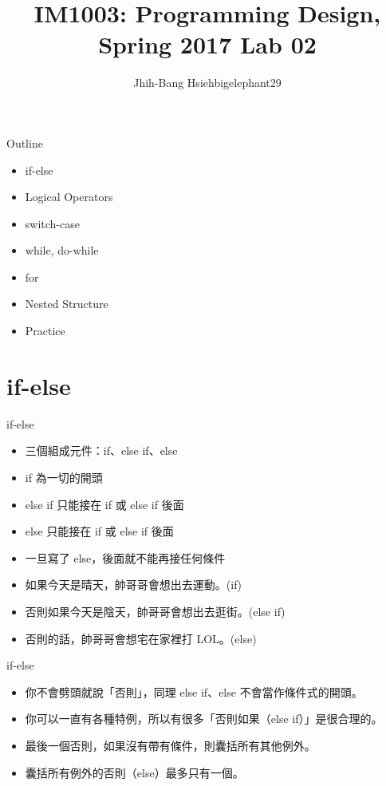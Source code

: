 \documentclass[t]{beamer}
\title{IM1003: Programming Design, Spring 2017  \linebreak Lab 02}
\author[bigelephant29]{Jhih-Bang Hsieh\linebreak \small{bigelephant29}}
\institute{\textbf{National Taiwan University}}
\date{}
\begin{document}
\begin{frame}
  \maketitle
\end{frame}

\begin{frame}{Outline}
  \begin{itemize}
    \item if-else
    \item Logical Operators
    \item switch-case
    \item while, do-while
    \item for
    \item Nested Structure
    \item Practice
  \end{itemize}
\end{frame}

\section{if-else}
\begin{frame}{if-else}
  \begin{itemize}
    \item 三個組成元件：if、else if、else
    \item if 為一切的開頭
    \item else if 只能接在 if 或 else if 後面
    \item else 只能接在 if 或 else if 後面
    \item 一旦寫了 else，後面就不能再接任何條件
  \end{itemize}
  \begin{itemize}
    \item 如果今天是晴天，帥哥哥會想出去運動。(if)
    \item 否則如果今天是陰天，帥哥哥會想出去逛街。(else if)
    \item 否則的話，帥哥哥會想宅在家裡打 LOL。(else)
  \end{itemize}
\end{frame}

\begin{frame}{if-else}
  \begin{itemize}
    \item 你不會劈頭就說「否則」，同理 else if、else 不會當作條件式的開頭。
    \item 你可以一直有各種特例，所以有很多「否則如果（else if）」是很合理的。
    \item 最後一個否則，如果沒有帶有條件，則囊括所有其他例外。
    \item 囊括所有例外的否則（else）最多只有一個。
  \end{itemize}
\end{frame}
\end{document}
